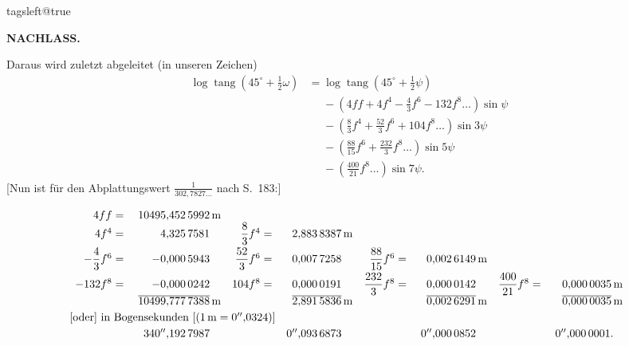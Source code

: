 \begingroup
\csname tagsleft@true\endcsname
\par\clearpage
\noindent{}\hfill{\small\textbf{NACHLASS.}}\hfill\null\par\medskip

Daraus wird zuletzt abgeleitet (in unseren Zeichen)
\[
\begin{aligned}
\log\operatorname{tang}(45^\circ+\tfrac12\omega)&=\log\operatorname{tang}(45^\circ+\tfrac12\psi)\\
&\phantom{={}}-\left(4ff+4f^4-\frac43f^6-132f^8\ldots\right)\sin\psi\\
&\phantom{={}}-\left(\frac83f^4+\frac{52}3f^6+104f^8\ldots\right)\sin3\psi\\
&\phantom{={}}-\left(\frac{88}{15}f^6+\frac{232}3f^8\ldots\right)\sin5\psi\\
&\phantom{={}}-\left(\frac{400}{21}f^8\ldots\right)\sin7\psi.
\end{aligned}
\]
[Nun ist für den Abplattungswert \(\frac{1}{302{,}7827\ldots}\) nach S.\ 183:]
{\small\setlength{\arraycolsep}{1.5pt}
\[
\begin{array}{rr@{\quad}rr@{\quad}rr@{\quad}rr}
4ff={}&10495{,}452\,5992\,\mathrm m\\
4f^4={}&4{,}325\,7581\phantom{\,\mathrm m}
 & \dfrac83 f^4={}&2{,}883\,8387\,\mathrm m\\[6pt]
-\dfrac43 f^6={}&-0{,}000\,5943\phantom{\,\mathrm m}
 & \dfrac{52}3 f^6={}&0{,}007\,7258\phantom{\,\mathrm m}
 & \dfrac{88}{15}f^6={}&0{,}002\,6149\,\mathrm m\\[6pt]
-132f^8={}&-0{,}000\,0242\phantom{\,\mathrm m}
 & 104f^8={}&0{,}000\,0191\phantom{\,\mathrm m}
 & \dfrac{232}3 f^8={}&0{,}000\,0142\phantom{\,\mathrm m}
 & \dfrac{400}{21}f^8={}&0{,}000\,0035\,\mathrm m\\
 &\overline{10499{,}777\,7388}\,\mathrm m
 & &\overline{2{,}891\,5836}\,\mathrm m
 & &\overline{0{,}002\,6291}\,\mathrm m
 & &\overline{0{,}000\,0035}\,\mathrm m\\[.6ex]
\multicolumn{8}{@{}l}{\text{[oder] in Bogensekunden [(}1\,\mathrm m=0^{\prime\prime}{,}0324\text{)]}}\\[.6ex]
 &340^{\prime\prime}{,}192\,7987\phantom{\,\mathrm m}
 & &0^{\prime\prime}{,}093\,6873\phantom{\,\mathrm m}
 & &0^{\prime\prime}{,}000\,0852\phantom{\,\mathrm m}
 & &0^{\prime\prime}{,}000\,0001.\phantom{\mathrm m}
\end{array}
\]
\par}
